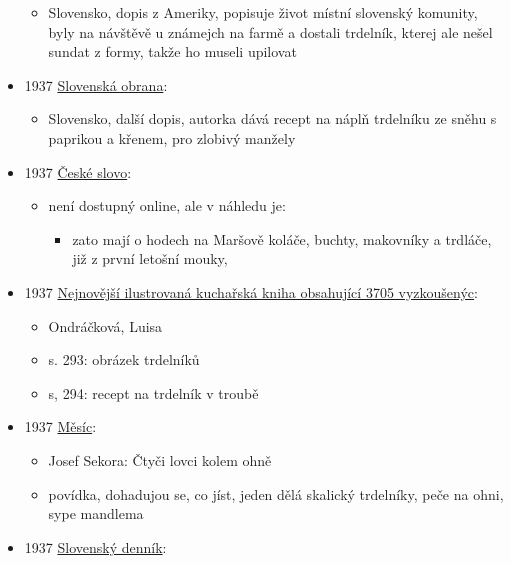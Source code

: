 \begin{itemize}
  \begin{itemize}
  \tightlist
  \item
    Slovensko, dopis z Ameriky, popisuje život místní slovenský
    komunity, byly na návštěvě u známejch na farmě a dostali trdelník,
    kterej ale nešel sundat z formy, takže ho museli upilovat
  \end{itemize}
\item
  1937
  \href{http://digitalna.kniznica.info/zoom/90688/view?search=trdeln\%C3\%ADk\%20OR\%20trdeln\%C3\%ADka\%20OR\%20trdeln\%C3\%ADku&page=6&p=separate&tool=search&view=2631,1599,4628,2266}{Slovenská
  obrana}:

  \begin{itemize}
  \tightlist
  \item
    Slovensko, další dopis, autorka dává recept na náplň trdelníku ze
    sněhu s paprikou a křenem, pro zlobivý manžely
  \end{itemize}
\item
  1937
  \href{https://ceskadigitalniknihovna.cz/uuid/uuid:b42af96b-ef00-4cc8-ac42-7413f52b7595}{České
  slovo}:

  \begin{itemize}
  \tightlist
  \item
    není dostupný online, ale v náhledu je:

    \begin{itemize}
    \tightlist
    \item
      zato mají o hodech na Maršově koláče, buchty, makovníky a trdláče,
      již z první letošní mouky,
    \end{itemize}
  \end{itemize}
\item
  1937
  \href{https://ceskadigitalniknihovna.cz/uuid/uuid:6f308ed0-4eaf-11ed-8756-005056827e51}{Nejnovější
  ilustrovaná kuchařská kniha obsahující 3705 vyzkoušenýc}:

  \begin{itemize}
  \tightlist
  \item
    Ondráčková, Luisa
  \item
    s. 293: obrázek trdelníků
  \item
    s, 294: recept na trdelník v troubě
  \end{itemize}
\item
  1937
  \href{https://ceskadigitalniknihovna.cz/uuid/uuid:0e56bea0-5587-11e5-81eb-001018b5eb5c}{Měsíc}:

  \begin{itemize}
  \tightlist
  \item
    Josef Sekora: Čtyči lovci kolem ohně
  \item
    povídka, dohadujou se, co jíst, jeden dělá skalický trdelníky, peče
    na ohni, sype mandlema
  \end{itemize}
\item
  1937
  \href{https://dikda.snk.sk/uuid/uuid:c5c32598-0c8a-4387-bc71-7ae1d3ab0b96}{Slovenský
  denník}:


\end{itemize}
